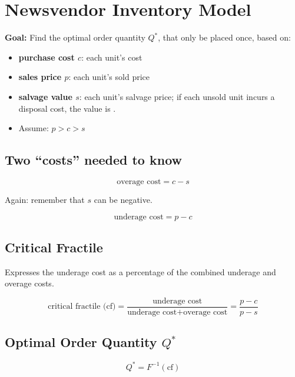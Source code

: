 \documentclass[11pt]{article}
\begin{document}
\section{Newsvendor Inventory Model}

\textbf{Goal:} Find the optimal order quantity $Q^*$, that only be placed once, based on:

\begin{itemize}
    \item \textbf{purchase cost $c$}: each unit's cost
    \item \textbf{sales price $p$}: each unit's sold price
    \item \textbf{salvage value $s$}: each unit's salvage price; if each unsold unit incurs a disposal cost, the value is .
    \item Assume: $p > c > s$
\end{itemize}

\subsection{Two ``costs'' needed to know}

\begin{equation}
    \text{overage cost} = c - s
\end{equation}

Again: remember that $s$ can be negative.

\begin{equation}
    \text{underage cost} = p - c
\end{equation}

\subsection{Critical Fractile}

Expresses the underage cost as a percentage of the combined underage and overage costs.

\begin{equation}
    \text{critical fractile (cf)} = \frac{\text{underage cost}}{\text{underage cost} + \text{overage cost}} = \frac{p - c}{p - s}
\end{equation}

\subsection{Optimal Order Quantity $Q^*$}

\begin{equation}
    Q^* = F^{-1}(\text{cf})
\end{equation}
\end{document}
